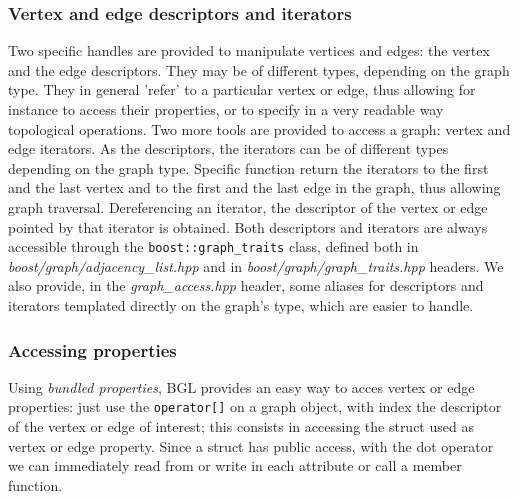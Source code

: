 \documentclass[10pt]{article} %
\newcommand{\classname}[1]{\texttt{#1}}
\begin{document}
	\subsubsection{Vertex and edge descriptors and iterators}
	Two specific handles are provided to manipulate vertices and edges: the vertex and the edge descriptors. They may be of different types, depending on the graph type. They in general 'refer' to a particular vertex or edge, thus allowing for instance to access their properties, or to specify in a very readable way topological operations. \newline
	Two more tools are provided to access a graph: vertex and edge iterators. As the descriptors, the iterators can be of different types depending on the graph type. Specific function return the iterators to the first and the last vertex and to the first and the last edge in the graph, thus allowing graph traversal. Dereferencing an iterator, the descriptor of the vertex or edge pointed by that iterator is obtained. \newline
	Both descriptors and iterators are always accessible through the \classname{boost::graph\_traits} class, defined both in \textit{boost/graph/adjacency\_list.hpp} and in \textit{boost/graph/graph\_traits.hpp} headers. We also provide, in the \textit{graph\_access.hpp} header, some aliases for descriptors and iterators templated directly on the graph's type, which are easier to handle.
	
	\subsubsection{Accessing properties}
	Using \textit{bundled properties}, BGL provides an easy way to acces vertex or edge properties: just use the \texttt{operator[]} on a graph object, with index the descriptor of the vertex or edge of interest; this consists in accessing the struct used as vertex or edge property. Since a struct has public access, with the dot operator we can immediately read from or write in each attribute or call a member function.	
	
\end{document}
